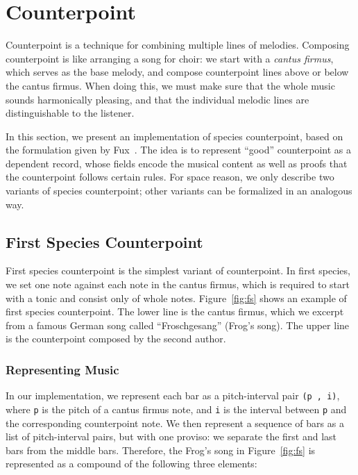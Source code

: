\section{Counterpoint}
\label{sec:cp}

Counterpoint is a technique for combining multiple lines of melodies.
Composing counterpoint is like arranging a song for choir:
we start with a \emph{cantus firmus}, which serves as the base melody,
and compose counterpoint lines above or below the cantus firmus.
When doing this, we must make sure that the whole music sounds
harmonically pleasing, and that the individual melodic lines are
distinguishable to the listener.

In this section, we present an implementation of species counterpoint,
based on the formulation given by Fux~\citep{fux-cp}.
The idea is to represent ``good'' counterpoint  as a dependent record,
whose fields encode the musical content as well as proofs that the
counterpoint follows certain rules.
For space reason, we only describe two variants of species counterpoint;
other variants can be formalized in an analogous way.

\subsection{First Species Counterpoint}
\label{sec:cp:fs}

\FS

First species counterpoint is the simplest variant of counterpoint.
In first species, we set one note against each note in the cantus firmus,
which is required to start with a tonic and consist only of whole notes.
Figure~\ref{fig:fs} shows an example of first species counterpoint.
The lower line is the cantus firmus, which we excerpt from a famous
German song called ``Froschgesang'' (Frog's song).
The upper line is the counterpoint composed by the second author.

\subsubsection{Representing Music}

In our implementation, we represent each bar as a pitch-interval pair
\texttt{(p ,  i)}, where \texttt{p} is the pitch of a cantus firmus note,
and \texttt{i} is the interval between \texttt{p} and the corresponding
counterpoint note.
We then represent a sequence of bars as a list of pitch-interval pairs,
but with one proviso: we separate the first and last bars from the
middle bars.
Therefore, the Frog's song in Figure~\ref{fig:fs} is represented as a
compound of the following three elements:

